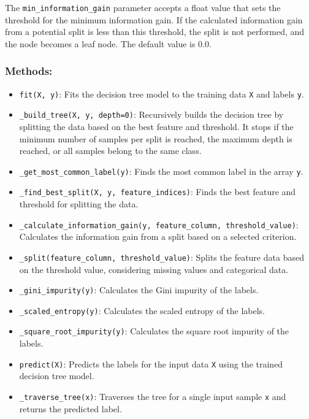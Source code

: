 \documentclass{article}
\begin{document}
The \texttt{min\_information\_gain} parameter accepts a float value that sets the threshold for the minimum information gain. If the calculated information gain from a potential split is less than this threshold, the split is not performed, and the node becomes a leaf node. The default value is 0.0.





\subsubsection*{Methods:}
\begin{itemize}
    \item \texttt{fit(X, y)}: Fits the decision tree model to the training data \texttt{X} and labels \texttt{y}.
    \item \texttt{\_build\_tree(X, y, depth=0)}: Recursively builds the decision tree by splitting the data based on the best feature and threshold. It stops if the minimum number of samples per split is reached, the maximum depth is reached, or all samples belong to the same class.
    \item \texttt{\_get\_most\_common\_label(y)}: Finds the most common label in the array \texttt{y}.
    \item \texttt{\_find\_best\_split(X, y, feature\_indices)}: Finds the best feature and threshold for splitting the data.
    \item \texttt{\_calculate\_information\_gain(y, feature\_column, threshold\_value)}: Calculates the information gain from a split based on a selected criterion.
    \item \texttt{\_split(feature\_column, threshold\_value)}: Splits the feature data based on the threshold value, considering missing values and categorical data.
    \item \texttt{\_gini\_impurity(y)}: Calculates the Gini impurity of the labels.
    \item \texttt{\_scaled\_entropy(y)}: Calculates the scaled entropy of the labels.
    \item \texttt{\_square\_root\_impurity(y)}: Calculates the square root impurity of the labels.
    \item \texttt{predict(X)}: Predicts the labels for the input data \texttt{X} using the trained decision tree model.
    \item \texttt{\_traverse\_tree(x)}: Traverses the tree for a single input sample \texttt{x} and returns the predicted label.
\end{itemize}
\end{document}
